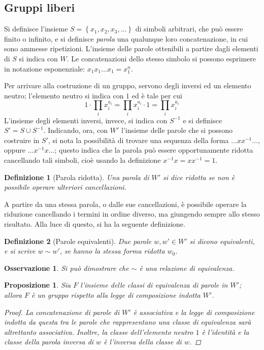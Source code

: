 \documentclass[12pt]{scrartcl}
\theoremstyle{style}
\newtheorem{definizione}{Definizione}[section]
\newtheorem{prop}{Proposizione}[section]
\newtheorem{osservazione}{Osservazione}[section]
\numberwithin{equation}{subsection}
\begin{document}
\subsection{Gruppi liberi}
Si definisce l'insieme $S=\left\{ x_1,x_2,x_3,\ldots \right\} $ di simboli arbitrari, che pu\`o essere finito o infinito, e si definisce \textit{parola} una qualunque loro concatenazione, in cui sono ammesse ripetizioni. 
L'insieme delle parole ottenibili a partire dagli elementi di $S$ si indica con $W $.
Le concatenazioni dello stesso simbolo si possono esprimere in notazione esponenziale: $x_1 x_1 \ldots x_1 = x_1^n$.

Per arrivare alla costruzione di un gruppo, servono degli inversi ed un elemento neutro; l'elemento neutro si indica con $1$ ed \`e tale per cui
\[
1 \cdot \prod_{i} x_i^{a_i} = \prod_{i} x_i^{a_i} \cdot 1 = \prod_{i} x_i^{a_i} 
\] 
L'insieme degli elementi inversi, invece, si indica con $S^{-1}$ e si definisce $S' = S \cup S^{-1}$.
Indicando, ora, con $W'$ l'insieme delle parole che si possono costruire in $S'$, si nota la possibilit\`a di trovare una sequenza della forma $\ldots x x^{-1}\ldots$, oppure $\ldots x^{-1}x \ldots$; questo indica che la parola pu\`o essere opportunamente ridotta cancellando tali simboli, cio\`e usando la definizione $x^{-1} x = x x^{-1}= 1$.
\begin{definizione}
	[Parola ridotta]
	Una parola di $W'$ si dice \textit{ridotta} se non \`e possibile operare ulteriori cancellazioni.
\end{definizione}
\noindent A partire da una stessa parola, o dalle sue cancellazioni, \`e possibile operare la riduzione cancellando i termini in ordine diverso, ma giungendo sempre allo stesso risultato.
Alla luce di questo, si ha la seguente definizione.
\begin{definizione}
	[Parole equivalenti]
	Due parole $w, w' \in W'$ si dicono \textit{equivalenti}, e si scrive $w \sim w'$, se hanno la stessa forma ridotta $w_0$.
\end{definizione}
\begin{osservazione}
	Si pu\`o dimostrare che $\sim$ \`e una relazione di equivalenza.
\end{osservazione}
\begin{prop}
	Sia $F$ l'insieme delle classi di equivalenza di parole in $W'$; allora $F$ \`e un gruppo rispetto alla legge di composizione indotta $W'$.
	\begin{proof}
		La concatenazione di parole di $W'$ \`e associativa e la legge di composizione indotta da questa tra le parole che rappresentano una classe di equivalenza sar\`a altrettanto associativa.
		Inoltre, la classe dell'elemento neutro $1$ \`e l'identit\`a e la classe della parola inversa di $w$ \`e l'inversa della classe di $w$.
	\end{proof}
\end{prop}
\end{document}
